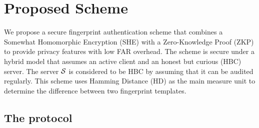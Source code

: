 \section{Proposed Scheme}
We propose a secure fingerprint authentication scheme that combines a Somewhat
Homomorphic Encryption (SHE) with a Zero-Knowledge Proof (ZKP) to provide privacy
features with low FAR overhead. The scheme is secure under a hybrid model that
assumes an active client and an
honest but curious (HBC) server. The server $\mathcal{S}$ is considered to be HBC
by assuming that it can be audited regularly. This scheme uses Hamming
Distance (HD) as the main measure unit to determine the difference between two
fingerprint templates.

\subsection{The protocol}
\label{sec:theProtocol}
